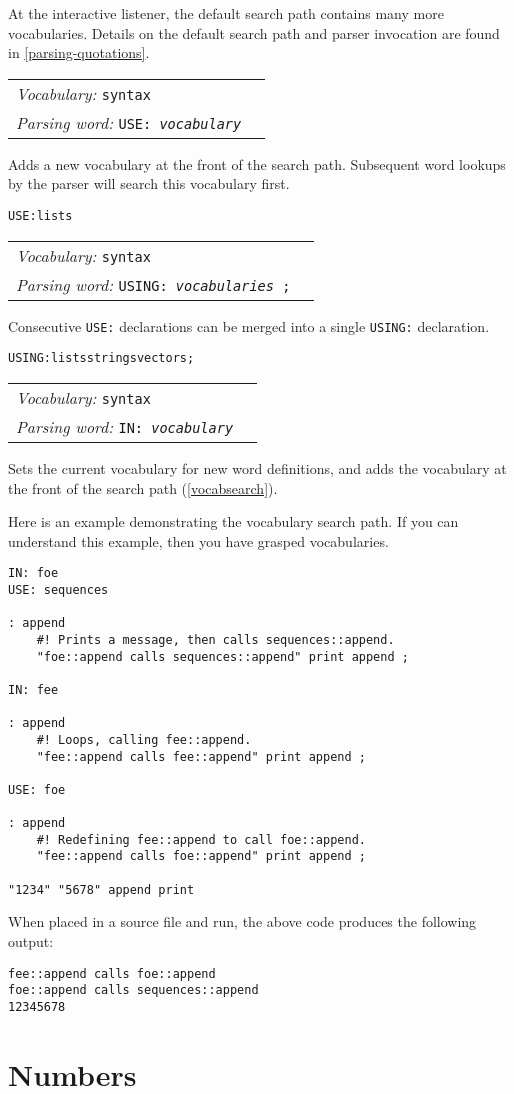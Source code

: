 \documentclass{book}
\newcommand{\vocabulary}[1]{\emph{Vocabulary:} \texttt{#1}&\\}
\newcommand{\parsingword}[2]{\index{\texttt{#1}}\emph{Parsing word:} \texttt{#2}&\\}
\newcommand{\wordtable}[1]{


\begin{tabularx}{12cm}{lX}
\hline
#1
\hline
\end{tabularx}

}
\begin{document}
At the interactive listener, the default search path contains many more vocabularies. Details on the default search path and parser invocation are found in \ref{parsing-quotations}.
\wordtable{
\vocabulary{syntax}
\parsingword{USE:}{USE: \emph{vocabulary}}
}
\newcommand{\useglos}{}
\useglos

Adds a new vocabulary at the front of the search path. Subsequent word lookups by the parser will search this vocabulary first.
\begin{alltt}
USE: lists
\end{alltt}
\wordtable{
\vocabulary{syntax}
\parsingword{USING:}{USING: \emph{vocabularies} ;}
}
Consecutive \texttt{USE:} declarations can be merged into a single \texttt{USING:} declaration.
\begin{alltt}
USING: lists strings vectors ;
\end{alltt}

\wordtable{
\vocabulary{syntax}
\parsingword{IN:}{IN:~\emph{vocabulary}}
}
Sets the current vocabulary for new word definitions, and adds the vocabulary at the front of the search path (\ref{vocabsearch}).

Here is an example demonstrating the vocabulary search path. If you can understand this example, then you have grasped vocabularies.
\begin{verbatim}
IN: foe
USE: sequences

: append
    #! Prints a message, then calls sequences::append.
    "foe::append calls sequences::append" print append ;

IN: fee

: append
    #! Loops, calling fee::append.
    "fee::append calls fee::append" print append ;
    
USE: foe

: append
    #! Redefining fee::append to call foe::append.
    "fee::append calls foe::append" print append ;

"1234" "5678" append print
\end{verbatim}
When placed in a source file and run, the above code produces the following output:
\begin{verbatim}
fee::append calls foe::append
foe::append calls sequences::append
12345678
\end{verbatim}

\section{Numbers}
\end{document}
